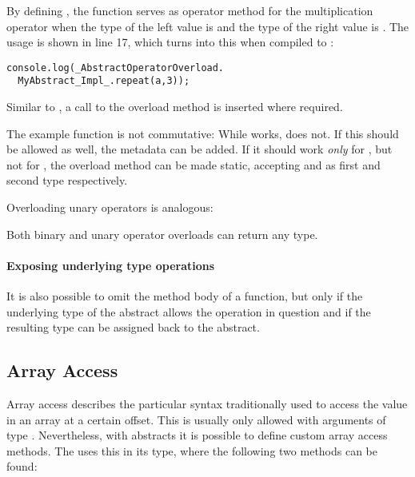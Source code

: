 By defining , the function  serves as operator method for the multiplication \expr{*} operator when the type of the left value is  and the type of the right value is . The usage is shown in line 17, which turns into this when compiled to :

\begin{lstlisting}
console.log(_AbstractOperatorOverload.
  MyAbstract_Impl_.repeat(a,3));
\end{lstlisting}
Similar to , a call to the overload method is inserted where required.

The example  function is not commutative: While  works,  does not. If this should be allowed as well, the  metadata can be added. If it should work \emph{only} for , but not for , the overload method can be made static, accepting  and  as first and second type respectively.

Overloading unary operators is analogous:

Both binary and unary operator overloads can return any type.

\paragraph{Exposing underlying type operations}

It is also possible to omit the method body of a  function, but only if the underlying type of the abstract allows the operation in question and if the resulting type can be assigned back to the abstract.




\subsection{Array Access}
\label{types-abstract-array-access}

Array access describes the particular syntax traditionally used to access the value in an array at a certain offset. This is usually only allowed with arguments of type . Nevertheless, with abstracts it is possible to define custom array access methods. The  uses this in its  type, where the following two methods can be found:

